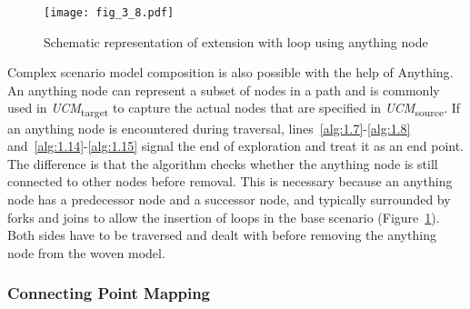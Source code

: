 \begin{figure}[h]
	\centering
	\texttt{[image: fig\_3\_8.pdf]}
	\caption{Schematic representation of extension with loop using anything node}
	\label{fig:3.8}
\end{figure}

Complex scenario model composition is also possible with the help of {\cls Anything}. An anything node can represent a subset of nodes in a path and is commonly used in \emph{UCM}\textsubscript{target} to capture the actual nodes that are specified in \emph{UCM}\textsubscript{source}. If an anything node is encountered during traversal, lines~\ref{alg:1.7}-\ref{alg:1.8} and~\ref{alg:1.14}-\ref{alg:1.15} signal the end of exploration and treat it as an end point. The difference is that the algorithm checks whether the anything node is still connected to other nodes before removal. This is necessary because an anything node has a predecessor node and a successor node, and typically surrounded by forks and joins to allow the insertion of loops in the base scenario (Figure~\ref{fig:3.8}). Both sides have to be traversed and dealt with before removing the anything node from the woven model.

\subsubsection{Connecting Point Mapping}

